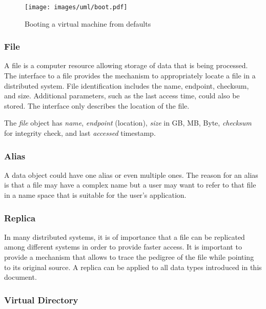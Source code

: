 \documentclass[10pt]{article}
\begin{document}
\begin{figure}[!h]
\centering
\texttt{[image: images/uml/boot.pdf]}
\caption{Booting a virtual machine from defaults}\label{F:uml-boot}
\end{figure}


\subsubsection{File}

A file is a computer resource allowing storage of data that is being
processed. The interface to a file provides the mechanism to
appropriately locate a file in a distributed system. File identification
includes the name, endpoint, checksum, and size. Additional
parameters, such as the last access time, could also be stored. 
The interface only describes the location of the file.

The \textit{file} object has \textit{name}, \textit{endpoint}
(location), \textit{size} in GB, MB, Byte, \textit{checksum} for
integrity check, and last \textit{accessed} timestamp.


\subsubsection{Alias}

A data object could have one alias or even multiple ones. The reason for an
alias is that a file may have a complex name but a user may want to
refer to that file in a name space that is suitable for the user's
application.


\subsubsection{Replica}

In many distributed systems, it is of importance that a file can be
replicated among different systems in order to provide faster access.
It is important to provide a mechanism that allows to trace the
pedigree of the file while pointing to its original source. A replica
can be applied to all data types introduced in this document.



\subsubsection{Virtual Directory}
\end{document}
